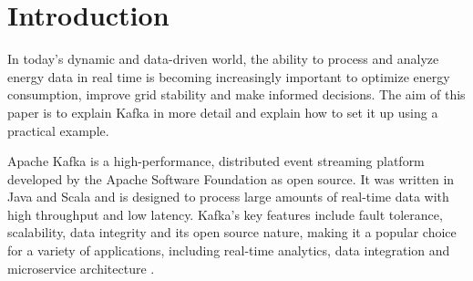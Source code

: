\section{Introduction}
\label{cha:introduction}

In today's dynamic and data-driven world, the ability to process and analyze energy data in real time is becoming increasingly important to optimize energy consumption, improve grid stability and make informed decisions. The aim of this paper is to explain Kafka in more detail and explain how to set it up using a practical example.

Apache Kafka is a high-performance, distributed event streaming platform developed by the Apache Software Foundation as open source. It was written in Java and Scala and is designed to process large amounts of real-time data with high throughput and low latency. Kafka's key features include fault tolerance, scalability, data integrity and its open source nature, making it a popular choice for a variety of applications, including real-time analytics, data integration and microservice architecture \cite{kafkaDoc}.